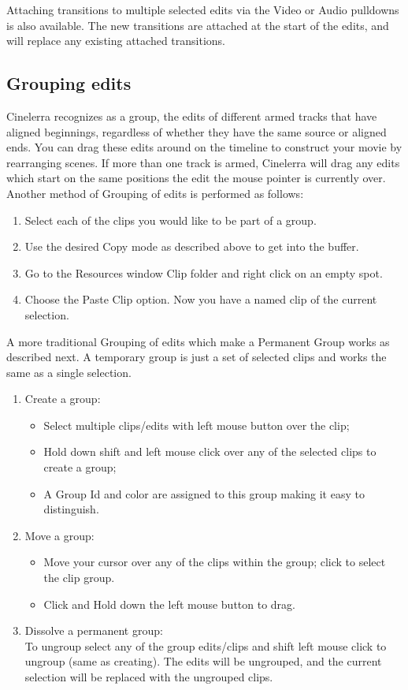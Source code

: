 Attaching transitions to multiple selected edits via the Video or Audio pulldowns is also available.  The new transitions are attached at the start of the edits, and will replace any existing attached transitions.

\subsection{Grouping edits}%
\label{sub:grouping_edits}

Cinelerra recognizes as a group, the edits of different armed tracks that have aligned beginnings, regardless of whether they have the same source or aligned ends.  You can drag these edits around on the timeline to construct your movie by rearranging scenes. If more than one track is armed, Cinelerra will drag any edits which start on the same positions the edit the mouse pointer is currently over. \\
Another method of Grouping of edits is performed as follows:
\begin{enumerate}
    \item Select each of the clips you would like to be part of a group.
    \item Use the desired Copy mode as described above to get into the buffer.
    \item Go to the Resources window Clip folder and right click on an empty spot.
    \item Choose the Paste Clip option.  Now you have a named clip of the current selection.
\end{enumerate}
A more traditional Grouping of edits which make a Permanent Group works as described next.  A temporary group is just a set of selected clips and works the same as a single selection.
\begin{enumerate}
    \item Create a group:
    \begin{itemize}[noitemsep]
        \item Select multiple clips/edits with left mouse button over the clip;
        \item Hold down shift and left mouse click over any of the selected clips to create a group;
        \item A Group Id and color are assigned to this group making it easy to distinguish.
    \end{itemize}
    \item Move a group:
    \begin{itemize}[noitemsep]
        \item Move your cursor over any of the clips within the group;  click to select the clip group.
        \item Click and Hold down the left mouse button to drag.
    \end{itemize}
    \item Dissolve a permanent group:\\
    To ungroup select any of the group edits/clips and shift left mouse click to ungroup (same as creating).
    The edits will be ungrouped, and the current selection will be replaced with the ungrouped clips.
\end{enumerate}
